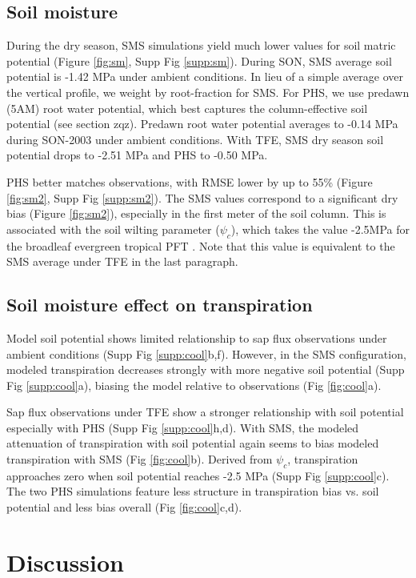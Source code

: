 \documentclass[draft,linenumbers]{agujournal}
\begin{document}
\subsection{Soil moisture}
    During the dry season, SMS simulations yield much lower values for soil matric potential (Figure \ref{fig:sm}, Supp Fig \ref{supp:sm}). 
    During SON, SMS average soil potential  is -1.42 MPa under ambient conditions. 
    In lieu of a simple average over the vertical profile, we weight by root-fraction for SMS.
    For PHS, we use predawn (5AM) root water potential, which best captures the column-effective soil potential (see section zqz).
    Predawn root water potential averages to -0.14 MPa during SON-2003 under ambient conditions.
    With TFE, SMS dry season soil potential drops to -2.51 MPa and PHS to -0.50 MPa.

    PHS better matches observations, with RMSE lower by up to 55\% (Figure \ref{fig:sm2}, Supp Fig \ref{supp:sm2}).
    The SMS values correspond to a significant dry bias (Figure \ref{fig:sm2}), especially in the first meter of the soil column.
    This is associated with the soil wilting parameter ($\psi_c$), which takes the value -2.5MPa for the broadleaf evergreen tropical PFT \citep{oleson2013}.
    Note that this value is equivalent to the SMS average under TFE in the last paragraph.
 
\subsection{Soil moisture effect on transpiration}    
    Model soil potential shows limited relationship to sap flux observations under ambient conditions (Supp Fig \ref{supp:cool}b,f).
    However, in the SMS configuration, modeled transpiration decreases strongly with more negative soil potential (Supp Fig \ref{supp:cool}a),
    biasing the model relative to observations (Fig \ref{fig:cool}a).
    
    Sap flux observations under TFE show a stronger relationship with soil potential especially with PHS (Supp Fig \ref{supp:cool}h,d).
    With SMS, the modeled attenuation of transpiration with soil potential again seems to bias modeled transpiration with SMS (Fig \ref{fig:cool}b).
    Derived from $\psi_c$, transpiration approaches zero when soil potential reaches -2.5 MPa (Supp Fig \ref{supp:cool}c).
    The two PHS simulations feature less structure in transpiration bias vs. soil potential and less bias overall (Fig \ref{fig:cool}c,d).
    
\section{Discussion}
\end{document}
